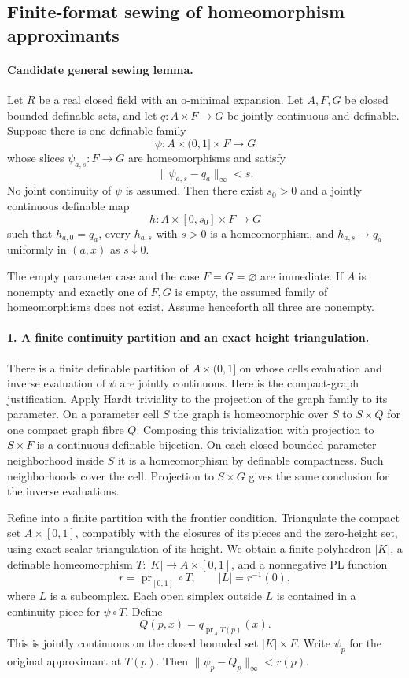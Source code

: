 \subsection*{Finite-format sewing of homeomorphism approximants}

\paragraph{Candidate general sewing lemma.}
Let $R$ be a real closed field with an o-minimal expansion. Let $A,F,G$
be closed bounded definable sets, and let $q:A\times F\to G$ be jointly
continuous and definable. Suppose there is one definable family
\[
 \psi:A\times(0,1]\times F\to G
\]
whose slices $\psi_{a,s}:F\to G$ are homeomorphisms and satisfy
\[
 \|\psi_{a,s}-q_a\|_\infty<s.
 \tag{FS.1}
\]
No joint continuity of $\psi$ is assumed. Then there exist $s_0>0$ and
a jointly continuous definable map
\[
 h:A\times[0,s_0]\times F\to G
\]
such that $h_{a,0}=q_a$, every $h_{a,s}$ with $s>0$ is a homeomorphism,
and $h_{a,s}\to q_a$ uniformly in $(a,x)$ as $s\downarrow0$.

The empty parameter case and the case $F=G=\varnothing$ are immediate.
If $A$ is nonempty and exactly one of $F,G$ is empty, the assumed family
of homeomorphisms does not exist. Assume henceforth all three are nonempty.

\paragraph{1. A finite continuity partition and an exact height triangulation.}
There is a finite definable partition of $A\times(0,1]$ on whose cells
evaluation and inverse evaluation of $\psi$ are jointly continuous.
Here is the compact-graph justification. Apply Hardt triviality to the
projection of the graph family to its parameter. On a parameter cell $S$
the graph is homeomorphic over $S$ to $S\times Q$ for one compact graph
fibre $Q$. Composing this trivialization with projection to $S\times F$
is a continuous definable bijection. On each closed bounded parameter
neighborhood inside $S$ it is a homeomorphism by definable compactness.
Such neighborhoods cover the cell. Projection to $S\times G$ gives
the same conclusion for the inverse evaluations.

Refine into a finite partition with the frontier condition. Triangulate
the compact set $A\times[0,1]$, compatibly with the closures of its pieces
and the zero-height set, using exact scalar triangulation of its height.
We obtain a finite polyhedron $|K|$, a definable homeomorphism
$T:|K|\to A\times[0,1]$, and a nonnegative PL function
\[
 r=\operatorname{pr}_{[0,1]}\circ T,
 \qquad |L|=r^{-1}(0),
\]
where $L$ is a subcomplex. Each open simplex outside $L$ is contained in
a continuity piece for $\psi\circ T$. Define
\[
 Q(p,x)=q_{\operatorname{pr}_A T(p)}(x).
\]
This is jointly continuous on the closed bounded set $|K|\times F$.
Write $\psi_p$ for the original approximant at $T(p)$. Then
$\|\psi_p-Q_p\|_\infty<r(p)$.

